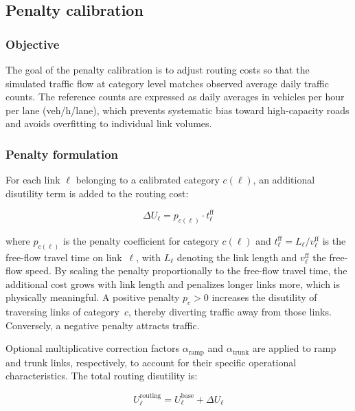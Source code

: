 \subsection{Penalty calibration}
\label{sec:penalty_calibration}

\subsubsection{Objective}
The goal of the penalty calibration is to adjust routing costs so that the simulated traffic flow at category level matches observed average daily traffic counts. The reference counts are expressed as daily averages in vehicles per hour per lane (veh/h/lane), which prevents systematic bias toward high-capacity roads and avoids overfitting to individual link volumes.

\subsubsection{Penalty formulation}
For each link $\ell$ belonging to a calibrated category $c(\ell)$, an additional disutility term is added to the routing cost:

\begin{equation}
    \Delta U_\ell = p_{c(\ell)} \cdot t_\ell^{\text{ff}}
    \label{eq:penalty}
\end{equation}

\noindent where $p_{c(\ell)}$ is the penalty coefficient for category $c(\ell)$ and $t_\ell^{\text{ff}} = L_\ell / v_\ell^{\text{ff}}$ is the free-flow travel time on link~$\ell$, with $L_\ell$ denoting the link length and $v_\ell^{\text{ff}}$ the free-flow speed. By scaling the penalty proportionally to the free-flow travel time, the additional cost grows with link length and penalizes longer links more, which is physically meaningful. A positive penalty $p_c > 0$ increases the disutility of traversing links of category~$c$, thereby diverting traffic away from those links. Conversely, a negative penalty attracts traffic.

Optional multiplicative correction factors $\alpha_{\text{ramp}}$ and $\alpha_{\text{trunk}}$ are applied to ramp and trunk links, respectively, to account for their specific operational characteristics. The total routing disutility is:

\begin{equation}
    U_\ell^{\text{routing}} = U_\ell^{\text{base}} + \Delta U_\ell
\end{equation}

